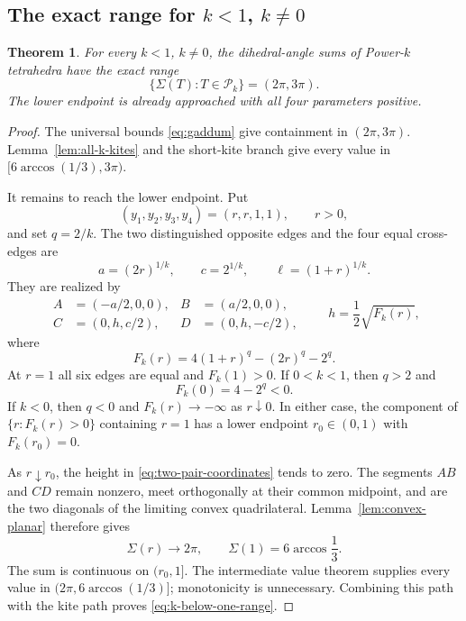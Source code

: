 \documentclass[11pt,a4paper]{article}
\newtheorem{theorem}{Theorem}[section]
\theoremstyle{definition}
\theoremstyle{remark}
\begin{document}
\subsection{\texorpdfstring{The exact range for $k<1$, $k\ne0$}
{The exact range for k below 1, excluding 0}}

\begin{theorem}\label{thm:k-below-one}
For every $k<1$, $k\ne0$, the dihedral-angle sums of Power-$k$
tetrahedra have the exact range
\begin{equation}\label{eq:k-below-one-range}
 \boxed{\{\Sigma(T):T\in\mathcal P_k\}=(2\pi,3\pi).}
\end{equation}
The lower endpoint is already approached with all four parameters positive.
\end{theorem}

\begin{proof}
The universal bounds \eqref{eq:gaddum} give containment in $(2\pi,3\pi)$.
Lemma~\ref{lem:all-k-kites} and the short-kite branch give every value in
$[6\arccos(1/3),3\pi)$.

It remains to reach the lower endpoint.  Put
\begin{equation}\label{eq:two-pair-path}
 (y_1,y_2,y_3,y_4)=(r,r,1,1),\qquad r>0,
\end{equation}
and set $q=2/k$.  The two distinguished opposite edges and the four equal
cross-edges are
\[
 a=(2r)^{1/k},\qquad c=2^{1/k},\qquad
 \ell=(1+r)^{1/k}.
\]
They are realized by
\begin{equation}\label{eq:two-pair-coordinates}
 \begin{aligned}
 A&=(-a/2,0,0),&B&=(a/2,0,0),\\
 C&=(0,h,c/2),&D&=(0,h,-c/2),
 \end{aligned}
 \qquad
 h=\frac12\sqrt{F_k(r)},
\end{equation}
where
\begin{equation}\label{eq:two-pair-feasibility}
 F_k(r)=4(1+r)^q-(2r)^q-2^q.
\end{equation}
At $r=1$ all six edges are equal and $F_k(1)>0$.  If $0<k<1$, then
$q>2$ and
\[
 F_k(0)=4-2^q<0.
\]
If $k<0$, then $q<0$ and $F_k(r)\to-\infty$ as $r\downarrow0$.
In either case, the component of $\{r:F_k(r)>0\}$ containing $r=1$ has a
lower endpoint $r_0\in(0,1)$ with $F_k(r_0)=0$.

As $r\downarrow r_0$, the height in
\eqref{eq:two-pair-coordinates} tends to zero.  The segments $AB$ and $CD$
remain nonzero, meet orthogonally at their common midpoint, and are the two
diagonals of the limiting convex quadrilateral.  Lemma~\ref{lem:convex-planar}
therefore gives
\[
 \Sigma(r)\longrightarrow2\pi,
 \qquad
 \Sigma(1)=6\arccos\frac13.
\]
The sum is continuous on $(r_0,1]$.  The intermediate value theorem supplies
every value in $(2\pi,6\arccos(1/3)]$; monotonicity is unnecessary.  Combining
this path with the kite path proves \eqref{eq:k-below-one-range}.
\end{proof}
\end{document}
